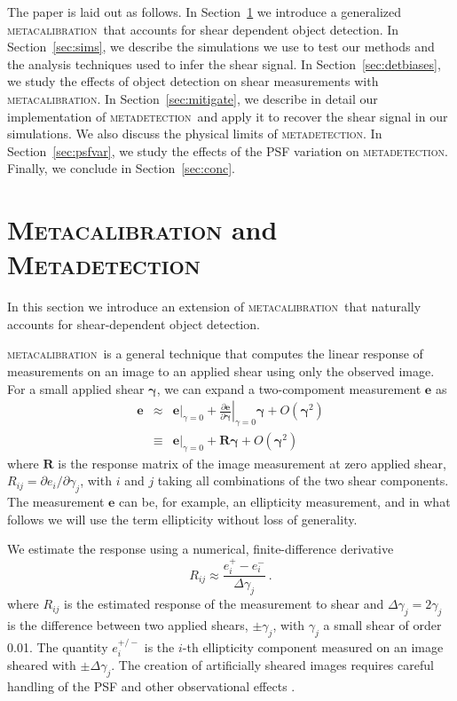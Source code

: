\documentclass[iop, twocolappendix, appendixfloats, numberedappendix, apj]{hackemulateapj}
\newcommand{\mcal}{\textsc{metacalibration}}
\newcommand{\mdet}{\textsc{metadetection}}
\begin{document}
The paper is laid out as follows. In Section~\ref{sec:mdet} we introduce a
generalized \mcal\ that accounts for shear dependent object detection.  In
Section~\ref{sec:sims}, we describe the simulations we use to test our methods
and the analysis techniques used to infer the shear signal. In
Section~\ref{sec:detbiases}, we study the effects of object detection on shear
measurements with \mcal.  In Section~\ref{sec:mitigate}, we describe in detail
our implementation of \mdet\ and apply it to recover the shear signal
in our simulations. We also discuss the physical limits of
\mdet.  In Section~\ref{sec:psfvar}, we study the effects of the PSF
variation on \mdet.  Finally, we conclude in Section~\ref{sec:conc}.

\section{\textsc{Metacalibration} and \textsc{Metadetection}}
\label{sec:mdet}

In this section we introduce an extension of \mcal\ that naturally accounts for
shear-dependent object detection.

\mcal\ is a general technique that computes the linear response of measurements
on an image to an applied shear using only the observed image.  For a small
applied shear $\boldsymbol{\gamma}$, we can expand a two-compoment
measurement $\boldsymbol{e}$ as
\begin{eqnarray}
\boldsymbol{e} & \approx & \left.\boldsymbol{e}\right|_{\gamma=0} +
                           \left.\frac{\partial \boldsymbol{e}}{\partial\boldsymbol\gamma}\right|_{\gamma=0} \boldsymbol\gamma +
                           O(\boldsymbol\gamma^2)\nonumber\\
               & \equiv  & \left.\boldsymbol{e}\right|_{\gamma=0} +
                           \boldsymbol{R} \boldsymbol\gamma +
                           O(\boldsymbol\gamma^2)
\end{eqnarray}
where $\boldsymbol{R}$ is the response matrix of the image measurement
at zero applied shear, $R_{ij}=\partial e_i /\partial \gamma_j$, with $i$ and
$j$ taking all combinations of the two shear components.  The measurement
$\boldsymbol{e}$ can be, for example,  an ellipticity measurement, and in what
follows we will use the term ellipticity without loss of generality.

We estimate the response using a numerical, finite-difference derivative
\begin{equation}
R_{ij} \approx \frac{e_i^{+} - e_i^{-}}{\Delta\gamma_j}\ .
\end{equation}
where $R_{ij}$ is the estimated response of the measurement to shear and
$\Delta\gamma_j = 2 \gamma_j$ is the difference between two applied shears,
$\pm \gamma_j$, with $\gamma_j$ a small shear of order 0.01. The quantity
$e_i^{+/-}$ is the $i$-th ellipticity component measured on an image sheared
with $\pm\Delta\gamma_j$.  The creation of artificially sheared images requires
careful handling of the PSF and other observational effects
\citep{SheldonMcal2017}.
\end{document}
